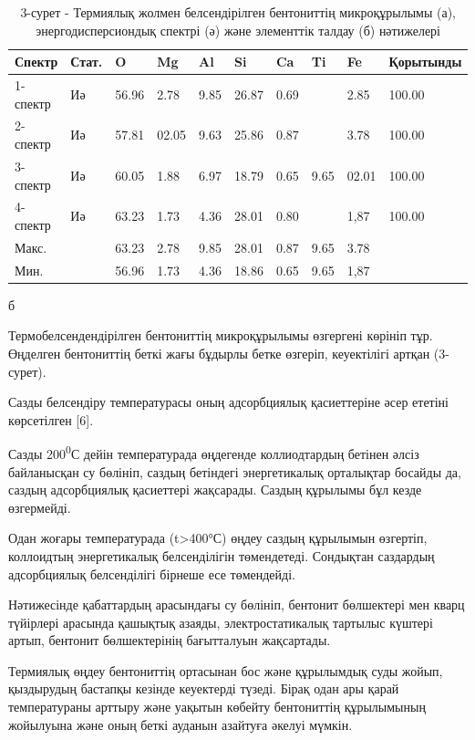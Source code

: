 \begin{table}[H]
\centering
\begin{tabular}{|l|l|l|l|l|l|l|l|l|l|}
\hline
Спектр & Стат. & O & Mg & Al & Si & Ca & Ti & Fe & Қорытынды \\ \hline
1-спектр & Иә & 56.96 & 2.78 & 9.85 & 26.87 & 0.69 &  & 2.85 & 100.00 \\ \hline
2-спектр & Иә & 57.81 & 02.05 & 9.63 & 25.86 & 0.87 &  & 3.78 & 100.00 \\ \hline
3-спектр & Иә & 60.05 & 1.88 & 6.97 & 18.79 & 0.65 & 9.65 & 02.01 & 100.00 \\ \hline
4-спектр & Иә & 63.23 & 1.73 & 4.36 & 28.01 & 0.80 &  & 1,87 & 100.00 \\ \hline
Макс. &  & 63.23 & 2.78 & 9.85 & 28.01 & 0.87 & 9.65 & 3.78 &  \\ \hline
Мин. &  & 56.96 & 1.73 & 4.36 & 18.86 & 0.65 & 9.65 & 1,87 &  \\ \hline
\end{tabular}
\caption*{б}
\caption*{3-сурет - Термиялық жолмен белсендірілген бентониттің микроқұрылымы (а), энергодисперсиондық спектрі (ә) және элементтік талдау (б) нәтижелері}
\end{table}

Термобелсендендірілген бентониттің микроқұрылымы өзгергені көрініп тұр.
Өңделген бентониттің беткі жағы бұдырлы бетке өзгеріп, кеуектілігі
артқан (3-сурет).

Сазды белсендіру температурасы оның адсорбциялық қасиеттеріне әсер
ететіні көрсетілген {[}6{]}.

Сазды 200\textsuperscript{0}С дейін температурада өңдегенде
коллиодтардың бетінен әлсіз байланысқан су бөлініп, саздың бетіндегі
энергетикалық орталықтар босайды да, саздың адсорбциялық қасиеттері
жақсарады. Саздың құрылымы бұл кезде өзгермейді.

Одан жоғары температурада (t\textgreater400°С) өңдеу саздың құрылымын
өзгертіп, коллоидтың энергетикалық белсенділігін төмендетеді. Сондықтан
саздардың адсорбциялық белсенділігі бірнеше есе төмендейді.

Нәтижесінде қабаттардың арасындағы су бөлініп, бентонит бөлшектері мен
кварц түйірлері арасында қашықтық азаяды, электростатикалық тартылыс
күштері артып, бентонит бөлшектерінің бағытталуын жақсартады.

Термиялық өңдеу бентониттің ортасынан бос және құрылымдық суды жойып,
қыздырудың бастапқы кезінде кеуектерді түзеді. Бірақ одан ары қарай
температураны арттыру және уақытын көбейту бентониттің құрылымының
жойылуына және оның беткі ауданын азайтуға әкелуі мүмкін.

